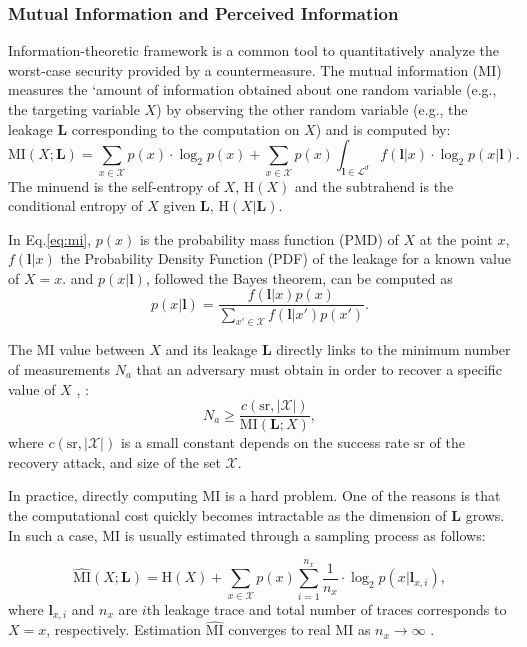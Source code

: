 \documentclass{llncs}
\begin{document}
	\subsubsection*{Mutual Information and Perceived Information}
	\medspace
	Information-theoretic framework  is a common tool to quantitatively analyze the worst-case security provided by a countermeasure. The mutual information (MI) measures the `amount of information  obtained about one random variable (e.g., the targeting variable $X$) by observing the other random variable (e.g., the leakage $\bm{L}$ corresponding to the computation on $X$) and is computed by:
	\begin{equation}\label{eq:mi}
		\text{MI}(X; \bm{L})  = \sum_{x\in \mathcal{X}} p(x)\cdot \log_2 p(x) + \sum_{x \in \mathcal{X}} p(x)\int_{\bm{l}\in \mathcal{L}^d}f(\bm{l}|x)\cdot \log_2 p(x|\bm{l}).
	\end{equation}
	The minuend is the self-entropy of $X$, $\text{H}(X)$ and the subtrahend is the conditional entropy of $X$ given $\bm{L}$, $\text{H}(X|\bm{L})$. 
	
	In Eq.\ref{eq:mi},  $p(x)$ is the probability mass function (PMD) of $X$ at the point $x$,  $f(\bm{l}|x)$ the Probability Density Function (PDF) of the leakage for a known value of $X=x$. and $p(x|\bm{l})$, followed the Bayes theorem, can be computed as
	\begin{equation}\label{eq:f2p}
		p(x|\bm{l}) = \frac{f(\bm{l}|x)p(x)}{\sum_{x'\in \mathcal{X}}f(\bm{l}|x')p(x')}.
	\end{equation}
	
	
	The MI value between $X$ and its leakage $\bm{L}$ directly links to the minimum number of measurements $N_a$ that an adversary must obtain in order to recover a specific value of $X$ \cite{mivsna}, \cite{mivsna2}:
	$$
	N_a \geq \frac{c(\text{sr}, |\mathcal{X}|)}{\text{MI}(\bm{L}; X)},
	$$
	where $c(\text{sr}, |\mathcal{X}|)$ is a small constant depends on the success rate $\text{sr}$ of the recovery attack, and size of the set $\mathcal{X}$.
	
	In practice, directly computing MI is a hard problem. One of the reasons is that the computational cost quickly becomes intractable as the dimension of $\bm{L}$ grows. In such a case, MI is usually estimated through a sampling process as follows:
	
	\begin{equation*}
		\widehat{\text{MI}}(X; \bm{L}) = \text{H}(X) + \sum_{x \in \mathcal{X}} p(x)\sum_{i=1}^{n_x}\frac{1}{n_x}\cdot \log_2 p(x|\bm{l}_{x, i}),
	\end{equation*}
	where $\bm{l}_{x, i}$ and $n_x$ are $i$th leakage trace and total number of traces corresponds to $X=x$, respectively. Estimation $\widehat{\text{MI}}$ converges to real MI as $n_x \rightarrow \infty$ \cite{lcert}.
	
\end{document}
